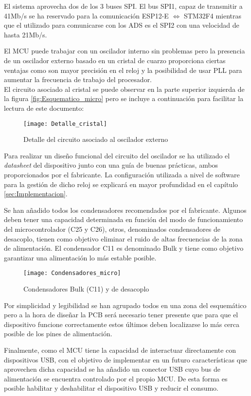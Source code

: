 \clearpage

El sistema aprovecha dos de los 3 buses \acrshort{SPI}. El bus SPI1, capaz de transmitir a 41Mb/s se ha reservado para la comunicación ESP12-E $\Longleftrightarrow$ STM32F4 mientras que el utilizado para comunicarse con los ADS es el SPI2 con una velocidad de hasta 21Mb/s.

El \acrshort{MCU} puede trabajar con un oscilador interno sin problemas pero la presencia de un oscilador externo basado en un cristal de cuarzo proporciona ciertas ventajas como son mayor precisión en el reloj y la posibilidad de usar \acrshort{PLL} para aumentar la frecuencia de trabajo del procesador.
\\El circuito asociado al cristal se puede observar en la parte superior izquierda de la figura \ref{fig:Esquematico_micro} pero se incluye a continuación para facilitar la lectura de este documento:

\begin{figure} [h]
    \centering
    \texttt{[image: Detalle\_cristal]}
    \caption{Detalle del circuito asociado al oscilador externo}
    \label{fig:Detalle_cristal}
\end{figure}


Para realizar un diseño funcional del circuito del oscilador se ha utilizado el \textit{datasheet} del dispositivo junto con una guía de buenas prácticas\cite{Guia_Oscilador}, ambos proporcionados por el fabricante. La configuración utilizada a nivel de software para la gestión de dicho reloj se explicará en mayor profundidad en el capítulo \ref{sec:Implementacion}.

Se han añadido todos los condensadores recomendados por el fabricante. Algunos deben tener una capacidad determinada en función del modo de funcionamiento del microcontrolador (C25 y C26), otros, denominados condensadores de desacoplo, tienen como objetivo eliminar el ruido de altas frecuencias de la zona de alimentación. El condensador C11 es denominado Bulk y tiene como objetivo garantizar una alimentación lo más estable posible.

\begin{figure} [h]
    \centering
    \texttt{[image: Condensadores\_micro]}
    \caption{Condensadores Bulk (C11) y de desacoplo}
    \label{fig:Condensadores_micro}
\end{figure}

 Por simplicidad y legibilidad se han agrupado todos en una zona del esquemático pero a la hora de diseñar la PCB será necesario tener presente que para que el dispositivo funcione correctamente estos últimos deben localizarse lo más cerca posible de los pines de alimentación.

Finalmente, como el \acrshort{MCU} tiene la capacidad de interactuar directamente con dispositivos \acrshort{USB}, con el objetivo de implementar en un futuro características que aprovechen dicha capacidad se ha añadido un conector \acrshort{USB} cuyo bus de alimentación se encuentra controlado por el propio \acrshort{MCU}. De esta forma es posible habilitar y deshabilitar el dispositivo USB y reducir el consumo.

